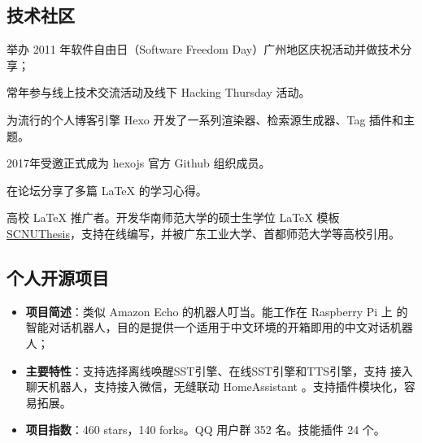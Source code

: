 \newpage

\subsection{\hei 技术社区}

{
  \begin{tightitemize}%
  \item 举办 2011 年软件自由日（Software Freedom Day）广州地区庆祝活动并做技术分享；
  \item 常年参与线上技术交流活动及线下 Hacking Thursday 活动。
  \end{tightitemize}}

{
  \begin{tightitemize}%
  \item 为流行的个人博客引擎 Hexo 开发了一系列渲染器、检索源生成器、Tag 插件和主题。
  \item 2017年受邀正式成为 hexojs 官方 Github 组织成员。
  \end{tightitemize}}

{
  \begin{tightitemize}%
  \item 在论坛分享了多篇 \LaTeX{} 的学习心得。
  \item 高校 \LaTeX{} 推广者。开发华南师范大学的硕士生学位 \LaTeX{} 模板
    \href{https://github.com/scnu/scnuthesis}{SCNUThesis}，支持在线编写，并被广东工业大学、首都师范大学等高校引用。
  \end{tightitemize}}

\subsection{\hei 个人开源项目}

%
  {
\begin{itemize}
\item \textbf{项目简述}：类似 Amazon Echo 的机器人叮当。能工作在 Raspberry Pi 上
  的智能对话机器人，目的是提供一个适用于中文环境的开箱即用的中文对话机器人；
\item \textbf{主要特性}：支持选择离线唤醒SST引擎、在线SST引擎和TTS引擎，支持
  接入聊天机器人，支持接入微信，无缝联动 HomeAssistant 。支持插件模块化，容易拓展。
\item \textbf{项目指数}：460 stars，140 forks。QQ 用户群 352 名。技能插件 24 个。
\end{itemize}}


